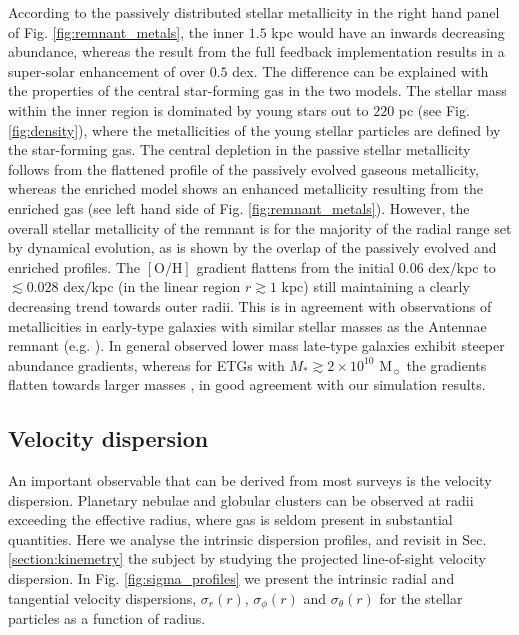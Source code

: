 \documentclass[a4paper,fleqn,usenatbib]{mnras}
\begin{document}
According to the passively distributed stellar metallicity in the right hand panel of Fig. \ref{fig:remnant_metals}, 
the inner $1.5$ kpc would have an inwards decreasing abundance,
whereas the result from the full feedback implementation results in a super-solar enhancement of over $0.5$ dex.
The difference can be explained with the properties of the central star-forming gas in the two models.
The stellar mass within the inner region is dominated by young stars out to $220$ pc (see Fig. \ref{fig:density}),
where the metallicities of the young stellar particles are defined by the star-forming gas.
The central depletion in the passive stellar metallicity follows from the flattened profile of
the passively evolved gaseous metallicity, whereas the enriched model shows an enhanced metallicity resulting from the enriched gas 
(see left hand side of Fig. \ref{fig:remnant_metals}).
However, the overall stellar metallicity of the remnant is for the majority of the radial range set by dynamical evolution,
as is shown by the overlap of the passively evolved and enriched profiles.
The $[\mathrm{O}/\mathrm{H}]$ gradient flattens from the initial $0.06$ dex$/$kpc to $\lesssim 0.028$ dex$/$kpc (in the linear region $r\gtrsim 1$ kpc) 
still maintaining a clearly decreasing trend towards outer radii. This is in agreement with observations of metallicities in early-type 
galaxies with similar stellar masses as the Antennae remnant (e.g. \citealp{2010MNRAS.407..144T,2012MNRAS.426.2300L}). 
In general observed lower mass late-type galaxies exhibit steeper abundance gradients, whereas for ETGs with $M_*\gtrsim2\times10^{10}$ M$_{\sun}$ 
the gradients flatten towards larger masses \citep{2010MNRAS.407..144T}, in good agreement with our simulation results.





\subsection{Velocity dispersion}

An important observable that can be derived from most surveys is the velocity dispersion.
Planetary nebulae and globular clusters can be observed at radii exceeding the effective radius, where gas is seldom present in substantial quantities.
Here we analyse the intrinsic dispersion profiles, and revisit in Sec. \ref{section:kinemetry} the subject by studying 
the projected line-of-sight velocity dispersion. 
In Fig. \ref{fig:sigma_profiles} we present the intrinsic radial and tangential 
velocity dispersions, $\sigma_r (r)$, $\sigma_\phi (r)$ and $\sigma_\theta (r)$
for the stellar particles  as a function of radius.
\end{document}
